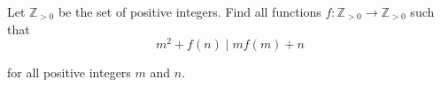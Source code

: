 Let $\mathbb{Z} _{>0}$ be the set of positive integers. Find all functions  $f: \mathbb{Z} _{>0}\rightarrow \mathbb{Z} _{>0}$ such that\[ m^2 + f(n) \mid mf(m) +n \]

for all positive integers $m$ and $n$.